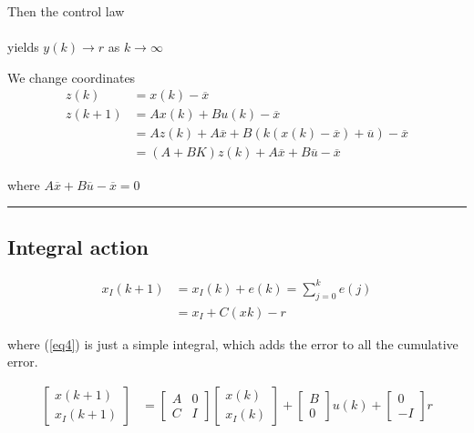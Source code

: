 \documentclass[a4paper]{article}
\begin{document}
Then the control law \\
\hspace{40pt}\\
yields $ y(k) \rightarrow r $ as $ k \rightarrow \infty  $

We change coordinates
\begin{align}
z(k) &=  x(k) - \overline{x} \\
z(k+1) &= A x(k) + B u(k) - \overline{x} \\
	   &= A z(k) +A \overline{x} + B(k(x(k) - \overline{x}) + \overline{u}) - \overline{x}\\ &= (A+B K) z(k) + A \overline{x} + B \overline{u} - \overline{x}
\end{align}

where $ A \overline{x} + B \overline{u} - \overline{x} =  0$  

\vspace{5pt}
\hrule
\vspace{5pt}

\subsection{Integral action}
\begin{align} 
x_I(k+1) &= x_I(k) + e(k) = \sum_{j=0}^{k}{e(j)} \label{eq4}\\  
		 &= x_I + C(xk) - r \label{eq5}
\end{align}

where (\ref{eq4}) is just a simple integral, which adds the error to all the cumulative error.  


\begin{align}
\begin{bmatrix}
x(k+1) \\
x_I(k+1)
\end{bmatrix}  &=  \begin{bmatrix}
A & 0 \\
C & I
\end{bmatrix} \begin{bmatrix}
x(k) \\
x_I(k)
\end{bmatrix} + \begin{bmatrix}
B \\
0
\end{bmatrix} u(k) + \begin{bmatrix}
0 \\
-I
\end{bmatrix} r
\end{align}
\end{document}
